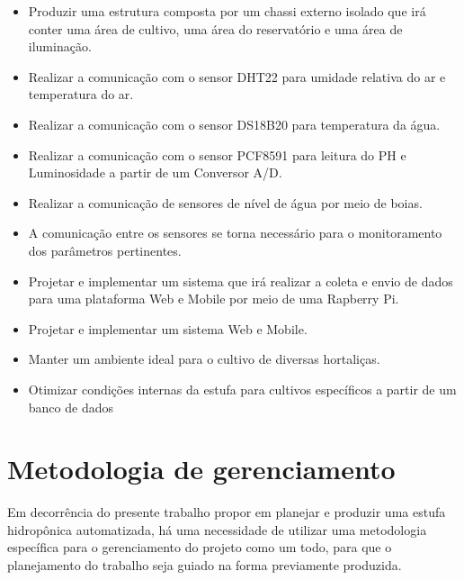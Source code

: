 	\begin{itemize}
 		
 		\item Produzir uma estrutura composta por um chassi externo isolado que irá conter uma área de cultivo, uma área do reservatório e uma área de iluminação.
 		
 		\item Realizar a comunicação com o sensor DHT22 para umidade relativa do ar e temperatura do ar.
 		
 		\item Realizar a comunicação com o sensor DS18B20 para temperatura da água.
 		
 		\item Realizar a comunicação com o sensor PCF8591 para leitura do PH e Luminosidade a partir de um Conversor A/D.
 		
 		\item Realizar a comunicação de sensores de nível de água por meio de boias.
 		
 		\item A comunicação entre os sensores se torna necessário para o monitoramento dos parâmetros pertinentes.
 		
 		\item Projetar e implementar um sistema que irá realizar a coleta e envio de dados para uma plataforma Web e Mobile por meio de uma Rapberry Pi.
 		
 		\item Projetar e implementar um sistema Web e Mobile.
 		
 		\item Manter um ambiente ideal para o cultivo de diversas hortaliças.
 		
 		\item Otimizar condições internas da estufa para cultivos específicos a partir de um banco de dados
 		
	\end{itemize}

\section{Metodologia de gerenciamento}

Em decorrência do presente trabalho propor em planejar e produzir uma estufa hidropônica automatizada, há uma necessidade de utilizar uma metodologia específica para o gerenciamento do projeto como um todo, para que o planejamento do trabalho seja guiado na forma previamente produzida.

